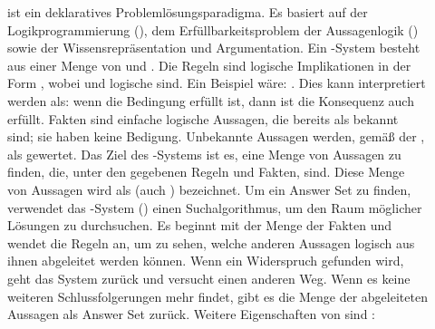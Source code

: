 \begin{description}
    \item[] ist ein deklaratives Problemlösungsparadigma.
    Es basiert auf der Logikprogrammierung (), dem Erfüllbarkeitsproblem der Aussagenlogik () sowie der Wissensrepräsentation und Argumentation.
    Ein -System besteht aus einer Menge von  und .
    Die Regeln sind logische Implikationen in der Form , wobei  und  logische  sind.
    Ein Beispiel wäre: .
    Dies kann interpretiert werden als: wenn die Bedingung  erfüllt ist, dann ist die Konsequenz  auch erfüllt.
    Fakten sind einfache logische Aussagen, die bereits als  bekannt sind; sie haben keine Bedigung.
    Unbekannte Aussagen werden, gemäß der , als  gewertet.
    Das Ziel des -Systems ist es, eine Menge von Aussagen zu finden, die, unter den gegebenen Regeln und Fakten,  sind.
    Diese Menge von Aussagen wird als  (auch ) bezeichnet.
    Um ein Answer Set zu finden, verwendet das -System () einen Suchalgorithmus, um den Raum möglicher Lösungen zu durchsuchen.
    Es beginnt mit der Menge der Fakten und wendet die Regeln an, um zu sehen, welche anderen Aussagen logisch aus ihnen abgeleitet werden können.
    Wenn ein Widerspruch gefunden wird, geht das System zurück und versucht einen anderen Weg.
    Wenn es keine weiteren Schlussfolgerungen mehr findet, gibt es die Menge der abgeleiteten Aussagen als Answer Set zurück.
    Weitere Eigenschaften von  sind \uA:
\end{description}


